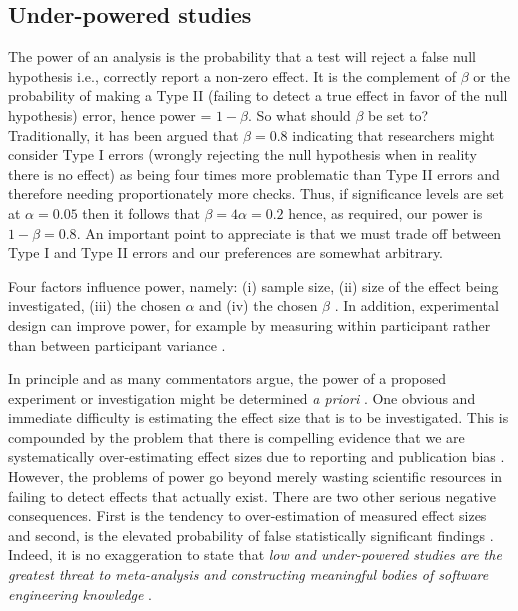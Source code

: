 \documentclass[preprint,10pt]{elsarticle}
\begin{document}
\subsection{Under-powered studies}

The power of an analysis is the probability that a test will reject a false null hypothesis i.e., correctly report a non-zero effect.  It is the complement of $\beta$ or the probability of making a Type II (failing to detect a true effect in favor of the null hypothesis) error, hence power = $1 - \beta$.  So what should $\beta$ be set to?  Traditionally, it has been argued that $\beta=0.8$ \cite{Cohe88} indicating that researchers might consider Type I errors (wrongly rejecting the null hypothesis when in reality there is no effect) as being four times more problematic than Type II errors and therefore needing proportionately more checks. Thus, if significance levels are set at $\alpha=0.05$ then it follows that $\beta = 4\alpha = 0.2$ hence, as required, our power is $1 - \beta = 0.8$.  An important point to appreciate is that we must trade off between Type I and Type II errors and our preferences are somewhat arbitrary.

Four factors influence power, namely: (i) sample size, (ii) size of the effect being investigated, (iii) the chosen $\alpha$ and (iv) the chosen $\beta$ \cite{Cohe92,Elli10}.  In addition, experimental design can improve power, for example by measuring within participant rather than between participant variance \cite{McCl00}.  

In principle and as many commentators argue, the power of a proposed experiment or investigation might be determined \emph{a priori} \cite{Dyba06}.  One obvious and immediate difficulty is estimating the effect size that is to be investigated.  This is compounded by the problem that there is compelling evidence that we are systematically over-estimating effect sizes due to reporting and publication bias \cite{Jorg16}.  However, the problems of power go beyond merely wasting scientific resources in failing to detect effects that actually exist.  There are two other serious negative consequences.  First is the tendency to over-estimation of measured effect sizes and second, is the elevated probability of false statistically significant findings \cite{Ioan05,Colq14}.  Indeed, it is no exaggeration to state that \textit{low and under-powered studies are the greatest threat to meta-analysis and constructing meaningful bodies of software engineering knowledge} \cite{Butt13}.
\end{document}
